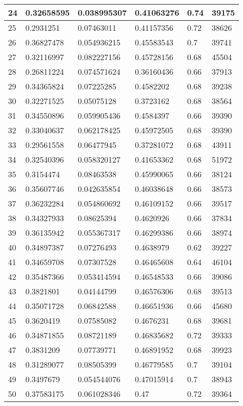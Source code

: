 \begin{longtable}{|l|l|l|l|l|l|}
24 & 0.32658595 & 0.038995307 & 0.41063276 & 0.74 & 39175 \\ \hline 
25 & 0.2931251 & 0.07463011 & 0.41157356 & 0.72 & 38626 \\ \hline 
26 & 0.36827478 & 0.054936215 & 0.45583543 & 0.7 & 39741 \\ \hline 
27 & 0.32116997 & 0.082227156 & 0.45728156 & 0.68 & 45504 \\ \hline 
28 & 0.26811224 & 0.074571624 & 0.36160436 & 0.66 & 37913 \\ \hline 
29 & 0.34365824 & 0.07225285 & 0.4582202 & 0.68 & 39238 \\ \hline 
30 & 0.32271525 & 0.05075128 & 0.3723162 & 0.68 & 38564 \\ \hline 
31 & 0.34550896 & 0.059905436 & 0.4584397 & 0.66 & 39390 \\ \hline 
32 & 0.33040637 & 0.062178425 & 0.45972505 & 0.68 & 39390 \\ \hline 
33 & 0.29561558 & 0.06477945 & 0.37281072 & 0.68 & 43911 \\ \hline 
34 & 0.32540396 & 0.058320127 & 0.41653362 & 0.68 & 51972 \\ \hline 
35 & 0.3154474 & 0.08463538 & 0.45990065 & 0.66 & 38124 \\ \hline 
36 & 0.35607746 & 0.042635854 & 0.46038648 & 0.66 & 38573 \\ \hline 
37 & 0.36232284 & 0.054860692 & 0.46109152 & 0.66 & 39517 \\ \hline 
38 & 0.34327933 & 0.08625394 & 0.4620926 & 0.66 & 37834 \\ \hline 
39 & 0.36135942 & 0.055367317 & 0.46299386 & 0.66 & 38974 \\ \hline 
40 & 0.34897387 & 0.07276493 & 0.4638979 & 0.62 & 39227 \\ \hline 
41 & 0.34659708 & 0.07307528 & 0.46465608 & 0.64 & 46104 \\ \hline 
42 & 0.35487366 & 0.053414594 & 0.46548533 & 0.66 & 39086 \\ \hline 
43 & 0.3821801 & 0.04144799 & 0.46576306 & 0.68 & 39513 \\ \hline 
44 & 0.35071728 & 0.06842588 & 0.46651936 & 0.66 & 45680 \\ \hline 
45 & 0.3620419 & 0.07585082 & 0.4676231 & 0.68 & 39681 \\ \hline 
46 & 0.34871855 & 0.08721189 & 0.46835682 & 0.72 & 39333 \\ \hline 
47 & 0.3831209 & 0.07739771 & 0.46891952 & 0.68 & 39923 \\ \hline 
48 & 0.31289077 & 0.08505399 & 0.46779585 & 0.7 & 39104 \\ \hline 
49 & 0.3497679 & 0.054544076 & 0.47015914 & 0.7 & 38943 \\ \hline 
50 & 0.37583175 & 0.061028346 & 0.47 & 0.72 & 39364 \\ \hline 
\end{longtable}